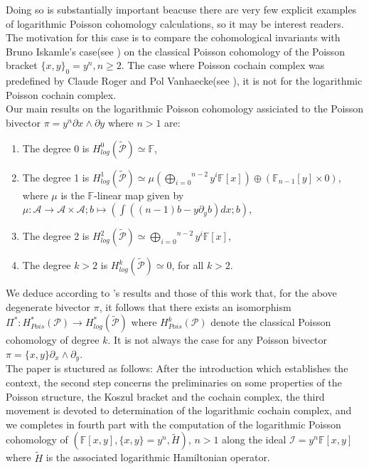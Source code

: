 \documentclass[a4paper, 12pt,oneside,reqno]{amsart}
\theoremstyle{definition}
\begin{document}
Doing so is substantially important beacuse there are very few explicit examples of logarithmic Poisson cohomology calculations, so it may be interest readers.
The motivation for this case is to compare the cohomological invariants with Bruno Iskamle's case(see \cite{BI})   on the classical Poisson cohomology of the Poisson bracket $\{x,y\}_{0}=y^n, n\geq 2$. The case where Poisson cochain complex was predefined by Claude Roger and Pol Vanhaecke(see \cite{CRPV}), it is not for the logarithmic Poisson cochain complex. \\

Our main results on the logarithmic Poisson cohomology assiciated to the Poisson bivector $\pi = y^n\partial x \wedge \partial y$ where $n>1$ are:
\begin{enumerate}
\item[$\bullet$] The degree 0 is $H_{log}^{0}(\tilde{\mathcal{P}}) \simeq \mathbb{F}$,
\item[$\bullet$] The degree 1 is $H_{log}^{1}(\tilde{\mathcal{P}}) \simeq  \mu (\overset{n-2}{\underset{i=0}{\bigoplus}}y^{i} \mathbb{F}[x])\oplus ( \mathbb{F}_{n-1}[y]\times 0)$, where $\mu$ is the  $\mathbb{F}$-linear map given by  $\mu : \mathcal{A} \longrightarrow \mathcal{A}\times \mathcal{A}; b\mapsto \left(\int ((n-1)b - y\partial_{y}b)dx; b\right)$,
\item[$\bullet$] The degree 2 is $H_{log}^{2}(\tilde{\mathcal{P}}) \simeq \overset{n-2}{\underset{i=0}{\bigoplus}}y^{i} \mathbb{F}[x]$,
\item[$\bullet$] The degree $k>2$ is $H_{log}^{k}(\tilde{\mathcal{P}}) \simeq 0$, for all $k>2$. 
\end{enumerate}
We deduce according to \cite{BI}'s results and those of this work that, for the above degenerate bivector $\pi$, it follows that there exists an isomorphism $\Pi^{*}: H_{Pois}^{*}(\mathcal{P}) \longrightarrow  H_{log}^{*}(\tilde{\mathcal{P}})$ where $H_{Pois}^{k}(\mathcal{P})$ denote  the classical Poisson cohomology of degree $k$. It is not always the case for any Poisson bivector $\pi = \{x,y\}\partial _{x}\wedge \partial _{y}$.\\

 The paper is stuctured as follows:
 After the introduction which establishes the context, the second step  concerns the preliminaries on some properties of the Poisson structure, the Koszul bracket and the cochain complex,  
the third movement  is devoted to determination of the logarithmic cochain complex,
 and we completes in fourth part with  the computation of the logarithmic Poisson
  cohomology of  $ (\mathbb{F}[x,y],\{x,y\}=y^n, \tilde{H})$, $n>1$ along the ideal $\mathcal{I}=y^n\mathbb{F}[x,y]$ where $\tilde{H}$ is the associated logarithmic Hamiltonian operator.  
 
\end{document}
